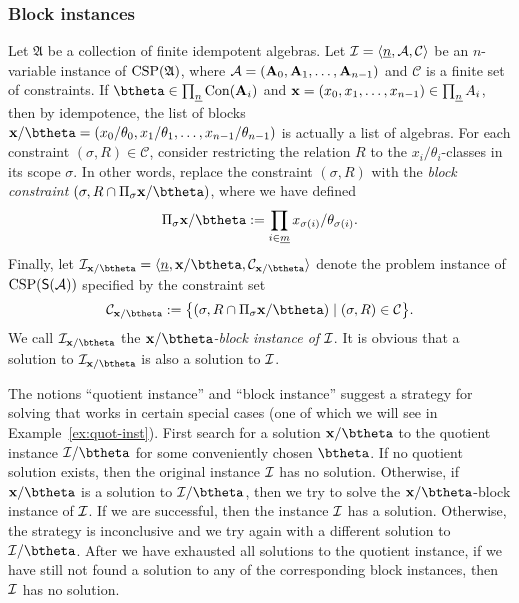 \subsubsection{Block instances}
\label{sec:block-inst}
Let $\mathfrak A$ be a collection of finite idempotent algebras.
Let $\mathcal{I} = \langle \underline{n}, \mathcal{A}, \mathcal C\rangle$
be an $n$-variable instance of $\operatorname{CSP}(\mathfrak A)$,
where $\mathcal{A} = (\mathbf{A}_0, \mathbf{A}_1, \dots, \mathbf{A}_{n-1})$ and 
$\mathcal C$ is a finite set of constraints.
If $\btheta \in \prod_{\nn}\Con (\bA_i)$ and  
$\mathbf{x} = (x_0, x_1, \dots, x_{n-1}) \in \prod_{\underline{n}}A_i$, then by idempotence,
the list of blocks
$\bx/\btheta = (x_0/\theta_0, x_1/\theta_1, \dots, x_{n-1}/\theta_{n-1})$
is actually a list of algebras.
For each constraint $(\sigma, R)\in \mathcal C$, consider
restricting the relation $R$ to the $x_i/\theta_i$-classes in its scope $\sigma$.
In other words, 
replace the constraint $(\sigma, R)$ with the \emph{block constraint}
$(\sigma, R \cap \Pi_{\sigma} \bx/\btheta)$, where we have defined
\begin{equation}
  \label{eq:theta-block-algebras-notation}
\Pi_{\sigma} \bx/\btheta:= \prod_{i \in \mm} x_{\sigma(i)}/\theta_{\sigma(i)}.
\end{equation}
Finally, let $\sI_{\bx/\btheta} = \< \nn, \bx/\btheta, \sC_{\bx/\btheta}\>$
denote the problem instance of
$\operatorname{CSP}(\mathsf{S}(\mathcal{A}))$
specified by the constraint set
\[
\mathcal{C}_{\bx/\btheta} := \bigl\{
(\sigma, R \cap \Pi_{\sigma}\bx/\btheta)
\mid
(\sigma, R) \in \mathcal{C}\bigr\}.
\]
We call $\sI_{\bx/\btheta}$ the \emph{$\bx/\btheta$-block instance of} $\mathcal{I}$.
It is obvious that a solution to $\sI_{\bx/\btheta}$ is also a solution to $\mathcal{I}$.



The notions ``quotient instance'' and ``block instance'' suggest a
strategy for solving \csps that works in
certain special cases (one of which we will see in Example~\ref{ex:quot-inst}).
First search for a solution $\bx/\btheta$
to the quotient instance $\sI/\btheta$ for some conveniently chosen $\btheta$.
If no quotient solution exists, then the original instance $\mathcal{I}$ has no solution.
Otherwise, if $\bx/\btheta$ is a solution to $\sI/\btheta$,
then we try to solve the $\bx/\btheta$-block instance of $\mathcal{I}$.
If we are successful, then the instance $\mathcal{I}$ has a solution.
Otherwise, the strategy is inconclusive and we try again with a different
solution to $\sI/\btheta$.
After we have exhausted all solutions to the quotient instance, if we have still
not found a solution to any of the corresponding block instances,
then $\mathcal{I}$ has no solution.

